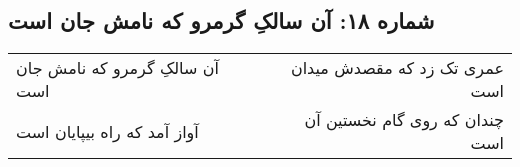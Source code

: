 \begin{center}
\section*{شماره ۱۸: آن سالکِ گرمرو که نامش جان است}
\label{sec:018}
\begin{longtable}{l p{0.5cm} r}
آن سالکِ گرمرو که نامش جان است
&&
عمری تک زد که مقصدش میدان است
\\
آواز آمد که راه بیپایان است
&&
چندان که روی گام نخستین آن است
\\
\end{longtable}
\end{center}
